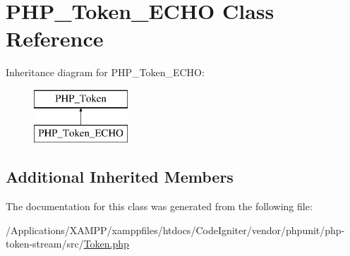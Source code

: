 \hypertarget{class_p_h_p___token___e_c_h_o}{}\section{P\+H\+P\+\_\+\+Token\+\_\+\+E\+C\+HO Class Reference}
\label{class_p_h_p___token___e_c_h_o}
Inheritance diagram for P\+H\+P\+\_\+\+Token\+\_\+\+E\+C\+HO\+:\begin{figure}[H]
\begin{center}
\leavevmode
\includegraphics[height=2.000000cm]{class_p_h_p___token___e_c_h_o}
\end{center}
\end{figure}
\subsection*{Additional Inherited Members}


The documentation for this class was generated from the following file\+:\begin{DoxyCompactItemize}
\item 
/\+Applications/\+X\+A\+M\+P\+P/xamppfiles/htdocs/\+Code\+Igniter/vendor/phpunit/php-\/token-\/stream/src/\mbox{\hyperlink{_token_8php}{Token.\+php}}\end{DoxyCompactItemize}

